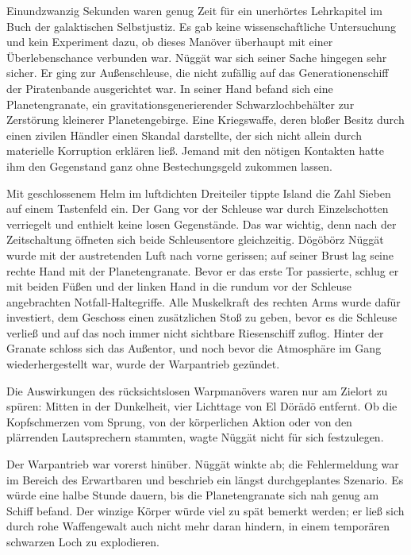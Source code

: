 Einundzwanzig Sekunden waren genug Zeit für ein unerhörtes Lehrkapitel im Buch der galaktischen Selbstjustiz. Es gab keine wissenschaftliche Untersuchung und kein Experiment dazu, ob dieses Manöver überhaupt mit einer Überlebenschance verbunden war. Nüggät war sich seiner Sache hingegen sehr sicher. Er ging zur Außenschleuse, die nicht zufällig auf das Generationenschiff der Piratenbande ausgerichtet war. In seiner Hand befand sich eine Planetengranate, ein gravitationsgenerierender Schwarzlochbehälter zur Zerstörung kleinerer Planetengebirge. Eine Kriegswaffe, deren bloßer Besitz durch einen zivilen Händler einen Skandal darstellte, der sich nicht allein durch materielle Korruption erklären ließ. Jemand mit den nötigen Kontakten hatte ihm den Gegenstand ganz ohne Bestechungsgeld zukommen lassen.

Mit geschlossenem Helm im luftdichten Dreiteiler tippte Island die Zahl Sieben auf einem Tastenfeld ein. Der Gang vor der Schleuse war durch Einzelschotten verriegelt und enthielt keine losen Gegenstände. Das war wichtig, denn nach der Zeitschaltung öffneten sich beide Schleusentore gleichzeitig. Dögöbörz Nüggät wurde mit der austretenden Luft nach vorne gerissen; auf seiner Brust lag seine rechte Hand mit der Planetengranate. Bevor er das erste Tor passierte, schlug er mit beiden Füßen und der linken Hand in die rundum vor der Schleuse angebrachten Notfall-Haltegriffe. Alle Muskelkraft des rechten Arms wurde dafür investiert, dem Geschoss einen zusätzlichen Stoß zu geben, bevor es die Schleuse verließ und auf das noch immer nicht sichtbare Riesenschiff zuflog. Hinter der Granate schloss sich das Außentor, und noch bevor die Atmosphäre im Gang wiederhergestellt war, wurde der Warpantrieb gezündet.

Die Auswirkungen des rücksichtslosen Warpmanövers waren nur am Zielort zu spüren: Mitten in der Dunkelheit, vier Lichttage von El Dörädö entfernt. Ob die Kopfschmerzen vom Sprung, von der körperlichen Aktion oder von den plärrenden Lautsprechern stammten, wagte Nüggät nicht für sich festzulegen.


Der Warpantrieb war vorerst hinüber. Nüggät winkte ab; die Fehlermeldung war im Bereich des Erwartbaren und beschrieb ein längst durchgeplantes Szenario. Es würde eine halbe Stunde dauern, bis die Planetengranate sich nah genug am Schiff befand. Der winzige Körper würde viel zu spät bemerkt werden; er ließ sich durch rohe Waffengewalt auch nicht mehr daran hindern, in einem temporären schwarzen Loch zu explodieren.

